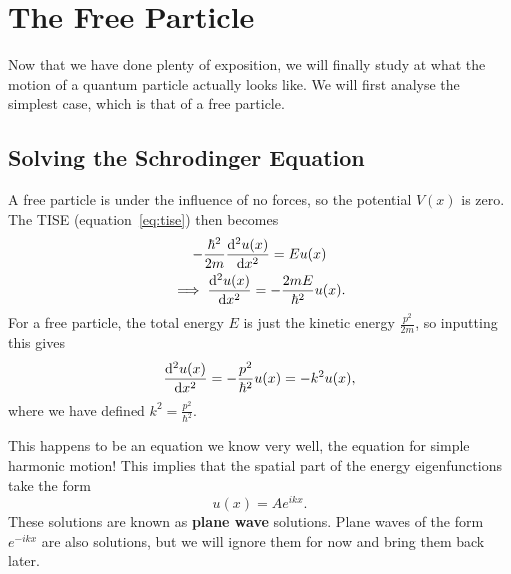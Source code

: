 \documentclass[../quantum_mechanics.tex]{subfiles}
\begin{document}
    \section{The Free Particle}\label{sec:free-particle}
        Now that we have done plenty of exposition, we will finally study at what the motion of a quantum particle actually looks like.
        We will first analyse the simplest case, which is that of a free particle.

        \subsection{Solving the Schrodinger Equation}\label{sec:free-particle:subsec:solving-the-schrodinger-equation}
            A free particle is under the influence of no forces, so the potential $V(x)$ is zero.
            The TISE (equation~\ref{eq:tise}) then becomes
            \begin{gather}\label{eq:free-tise}
                -\frac{\hbar^2}{2m}\dv[2]{u(x)}{x}=Eu(x)\\
                \implies\dv[2]{u(x)}{x}=-\frac{2mE}{\hbar^2}u(x).
            \end{gather}
            For a free particle, the total energy $E$ is just the kinetic energy $\frac{p^2}{2m}$, so inputting this gives
            \begin{equation}
                \dv[2]{u(x)}{x}=-\frac{p^2}{\hbar^2}u(x)=-k^2u(x),
            \end{equation}
            where we have defined $k^2=\frac{p^2}{\hbar^2}$.

            This happens to be an equation we know very well, the equation for simple harmonic motion!
            This implies that the spatial part of the energy eigenfunctions take the form
            \begin{equation}
                u(x)=Ae^{ikx}.
            \end{equation}
            These solutions are known as \textbf{plane wave} solutions.
            Plane waves of the form $e^{-ikx}$ are also solutions, but we will ignore them for now and bring them back later.
\end{document}
